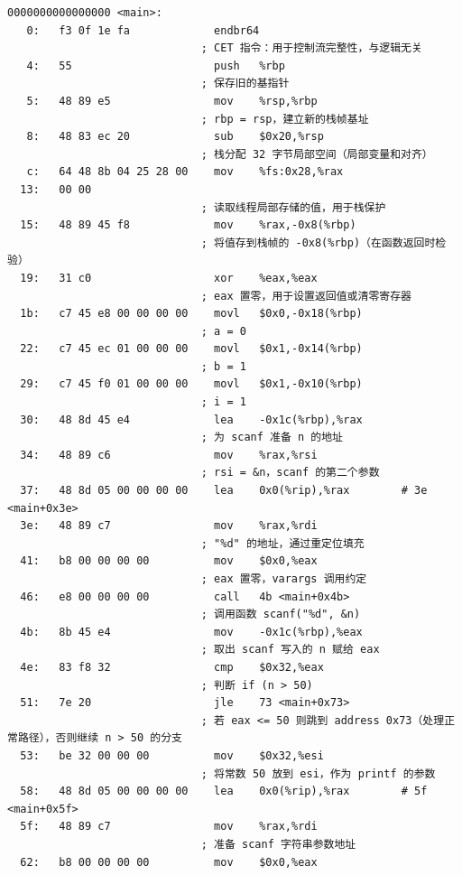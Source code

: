 \documentclass[UTF8,a4paper,10pt]{ctexart}
\begin{document}
\begin{lstlisting}[title=mainx86.o 反汇编结果与分析,frame=trbl,language={[x86masm]Assembler}]
0000000000000000 <main>:
   0:   f3 0f 1e fa             endbr64
                              ; CET 指令：用于控制流完整性，与逻辑无关
   4:   55                      push   %rbp
                              ; 保存旧的基指针
   5:   48 89 e5                mov    %rsp,%rbp
                              ; rbp = rsp，建立新的栈帧基址
   8:   48 83 ec 20             sub    $0x20,%rsp
                              ; 栈分配 32 字节局部空间（局部变量和对齐）
   c:   64 48 8b 04 25 28 00    mov    %fs:0x28,%rax
  13:   00 00 
                              ; 读取线程局部存储的值，用于栈保护
  15:   48 89 45 f8             mov    %rax,-0x8(%rbp)
                              ; 将值存到栈帧的 -0x8(%rbp)（在函数返回时检验）
  19:   31 c0                   xor    %eax,%eax
                              ; eax 置零，用于设置返回值或清零寄存器
  1b:   c7 45 e8 00 00 00 00    movl   $0x0,-0x18(%rbp)
                              ; a = 0
  22:   c7 45 ec 01 00 00 00    movl   $0x1,-0x14(%rbp)
                              ; b = 1
  29:   c7 45 f0 01 00 00 00    movl   $0x1,-0x10(%rbp)
                              ; i = 1
  30:   48 8d 45 e4             lea    -0x1c(%rbp),%rax
                              ; 为 scanf 准备 n 的地址
  34:   48 89 c6                mov    %rax,%rsi
                              ; rsi = &n，scanf 的第二个参数
  37:   48 8d 05 00 00 00 00    lea    0x0(%rip),%rax        # 3e <main+0x3e>
  3e:   48 89 c7                mov    %rax,%rdi
                              ; "%d" 的地址，通过重定位填充
  41:   b8 00 00 00 00          mov    $0x0,%eax
                              ; eax 置零，varargs 调用约定
  46:   e8 00 00 00 00          call   4b <main+0x4b>
                              ; 调用函数 scanf("%d", &n)
  4b:   8b 45 e4                mov    -0x1c(%rbp),%eax
                              ; 取出 scanf 写入的 n 赋给 eax
  4e:   83 f8 32                cmp    $0x32,%eax
                              ; 判断 if (n > 50)
  51:   7e 20                   jle    73 <main+0x73>
                              ; 若 eax <= 50 则跳到 address 0x73（处理正常路径），否则继续 n > 50 的分支
  53:   be 32 00 00 00          mov    $0x32,%esi
                              ; 将常数 50 放到 esi，作为 printf 的参数
  58:   48 8d 05 00 00 00 00    lea    0x0(%rip),%rax        # 5f <main+0x5f>
  5f:   48 89 c7                mov    %rax,%rdi
                              ; 准备 scanf 字符串参数地址
  62:   b8 00 00 00 00          mov    $0x0,%eax

\end{lstlisting}
\end{document}
